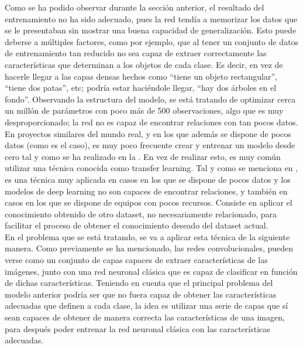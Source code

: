 			Como se ha podido observar durante la sección anterior, el resultado del entrenamiento no ha sido adecuado, pues la red tendía a memorizar los datos que se le presentaban sin mostrar una buena capacidad de generalización. Esto puede deberse a múltiples factores, como por ejemplo, que al tener un conjunto de datos de entrenamiento tan reducido no sea capaz de extraer correctamente las características que determinan a los objetos de cada clase. Es decir, en vez de hacerle llegar a las capas densas hechos como ``tiene un objeto rectangular'', ``tiene dos patas'', etc; podría estar haciéndole llegar, ``hay dos árboles en el fondo''. Observando la estructura del modelo, se está tratando de optimizar cerca un millón de parámetros con poco más de 500 observaciones, algo que es muy desproporcionado; la red no es capaz de encontrar relaciones con tan pocos datos. \\
			
			En proyectos similares del mundo real, y en los que además se dispone de pocos datos (como es el caso), es muy poco frecuente crear y entrenar un modelo desde cero tal y como se ha realizado en la . En vez de realizar esto, es muy común utilizar una técnica conocida como transfer learning. Tal y como se menciona en \cite{transfer}, es una técnica muy aplicada en casos en los que se dispone de pocos datos y los modelos de deep learning no son capaces de encontrar relaciones, y también en casos en los que se dispone de equipos con pocos recursos. Consiste en aplicar el conocimiento obtenido de otro dataset, no necesariamente relacionado, para facilitar el proceso de obtener el conocimiento deseado del dataset actual. \\
			
			En el problema que se está tratando, se va a aplicar esta técnica de la siguiente manera. Como previamente se ha mencionado, las redes convolucionales, pueden verse como un conjunto de capas capaces de extraer características de las imágenes, junto con una red neuronal clásica que es capaz de clasificar en función de dichas características. Teniendo en cuenta que el principal problema del modelo anterior podría ser que no fuera capaz de obtener las características adecuadas que definen a cada clase, la idea es utilizar una serie de capas que sí sean capaces de obtener de manera correcta las características de una imagen, para después poder entrenar la red neuronal clásica con las características adecuadas. \\
			
